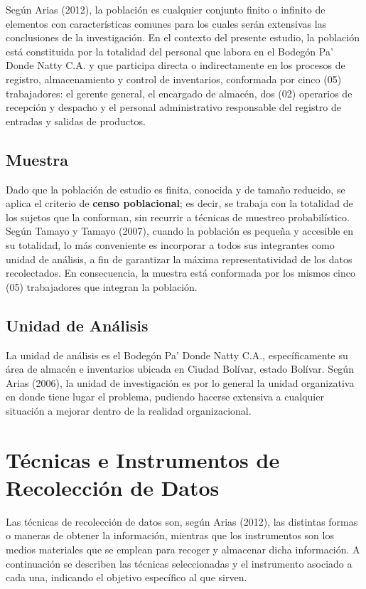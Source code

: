 \documentclass[12pt, letterpaper]{report}
\begin{document}
Según Arias (2012), la población es cualquier conjunto finito o infinito
de elementos con características comunes para los cuales serán extensivas
las conclusiones de la investigación. En el contexto del presente
estudio, la población está constituida por la totalidad del personal que
labora en el Bodegón Pa' Donde Natty C.A. y que participa directa o
indirectamente en los procesos de registro, almacenamiento y control de
inventarios, conformada por cinco (05) trabajadores: el gerente general,
el encargado de almacén, dos (02) operarios de recepción y despacho y el
personal administrativo responsable del registro de entradas y salidas
de productos.

\subsection{Muestra}

Dado que la población de estudio es finita, conocida y de tamaño
reducido, se aplica el criterio de \textbf{censo poblacional}; es decir,
se trabaja con la totalidad de los sujetos que la conforman, sin recurrir
a técnicas de muestreo probabilístico. Según Tamayo y Tamayo (2007),
cuando la población es pequeña y accesible en su totalidad, lo más
conveniente es incorporar a todos sus integrantes como unidad de
análisis, a fin de garantizar la máxima representatividad de los datos
recolectados. En consecuencia, la muestra está conformada por los mismos
cinco (05) trabajadores que integran la población.

\subsection{Unidad de Análisis}

La unidad de análisis es el Bodegón Pa' Donde Natty C.A.,
específicamente su área de almacén e inventarios ubicada en Ciudad
Bolívar, estado Bolívar. Según Arias (2006), la unidad de investigación
es por lo general la unidad organizativa en donde tiene lugar el
problema, pudiendo hacerse extensiva a cualquier situación a mejorar
dentro de la realidad organizacional.

\section{Técnicas e Instrumentos de Recolección de Datos}

Las técnicas de recolección de datos son, según Arias (2012), las
distintas formas o maneras de obtener la información, mientras que los
instrumentos son los medios materiales que se emplean para recoger y
almacenar dicha información. A continuación se describen las técnicas
seleccionadas y el instrumento asociado a cada una, indicando el
objetivo específico al que sirven.
\end{document}
